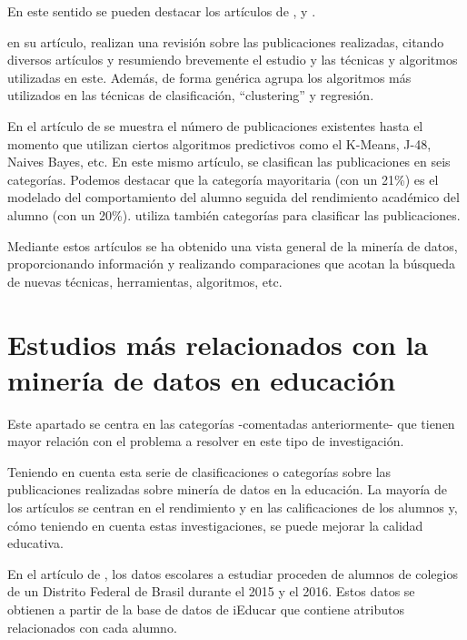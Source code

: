 En este sentido se pueden destacar los artículos de ,  y .

 en su artículo, realizan una revisión sobre las publicaciones realizadas, citando diversos artículos y resumiendo brevemente el estudio y las técnicas y algoritmos utilizadas en este. Además, de forma genérica agrupa los algoritmos más utilizados en las técnicas de clasificación, ``clustering'' y regresión.

En el artículo de  se muestra el número de publicaciones existentes hasta el momento que utilizan ciertos algoritmos predictivos como el K-Means, J-48, Naives Bayes, etc. En este mismo artículo, se clasifican las publicaciones en seis categorías. Podemos destacar que la categoría mayoritaria (con un 21\%) es el modelado del comportamiento del alumno seguida del rendimiento académico del alumno (con un 20\%).  utiliza también categorías para clasificar las publicaciones.

Mediante estos artículos se ha obtenido una vista general de la minería de datos, proporcionando información y realizando comparaciones que acotan la búsqueda de nuevas técnicas, herramientas, algoritmos, etc.


\section{Estudios más relacionados con la minería de datos en educación}
Este apartado se centra en las categorías -comentadas anteriormente- que tienen mayor relación con el problema a resolver en este tipo de investigación. %

Teniendo en cuenta esta serie de clasificaciones o categorías sobre las publicaciones realizadas sobre minería de datos en la educación. La mayoría de los artículos se centran en el rendimiento y en las calificaciones de los alumnos y, cómo teniendo en cuenta estas investigaciones, se puede mejorar la calidad educativa.

En el artículo de , los datos escolares a estudiar proceden de alumnos de colegios de un Distrito Federal de Brasil durante el 2015 y el 2016. Estos datos se obtienen a partir de la base de datos de iEducar que contiene atributos relacionados con cada alumno. 

